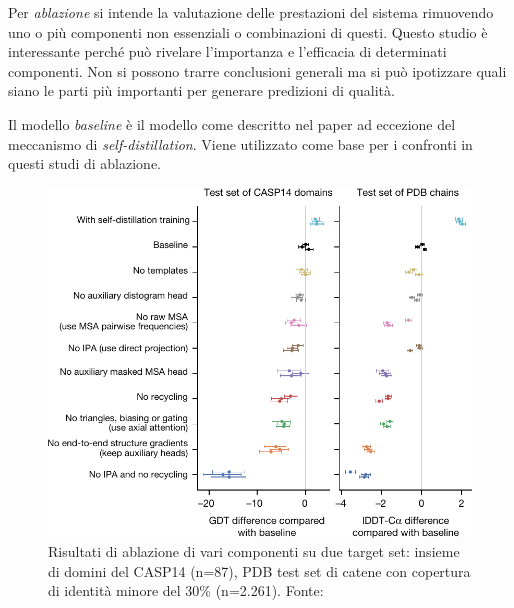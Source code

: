 Per \textit{ablazione} si intende la valutazione delle prestazioni del sistema rimuovendo uno o più componenti non essenziali o combinazioni di questi. Questo studio è interessante perché può rivelare l'importanza e l'efficacia di determinati componenti. Non si possono trarre conclusioni generali ma si può ipotizzare quali siano le parti più importanti per generare predizioni di qualità.

\par Il modello \textit{baseline} è il modello come descritto nel paper ad eccezione del meccanismo di \textit{self-distillation}. Viene utilizzato come base per i confronti in questi studi di ablazione. 

\begin{figure}[!htb]
	\centering
	\includegraphics[scale=0.6]{images/ablazione.png}
	\caption{Risultati di ablazione di vari componenti su due target set: insieme di domini del CASP14 (n=87), PDB test set di catene con copertura di identità minore del 30\% (n=2.261). Fonte: \cite{jumper2021highly}}
	\label{fig:ablazione1}
\end{figure}

